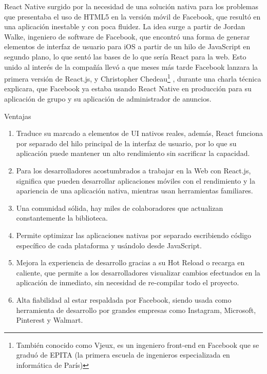 React Native surgido por la necesidad de una solución nativa para los problemas que presentaba el uso de HTML5 en la versión móvil de Facebook, que resultó en una aplicación inestable y con poca fluidez. La idea surge a partir de Jordan Walke, ingeniero de software de Facebook, que encontró una forma de generar elementos de interfaz de usuario para iOS a partir de un hilo de JavaScript en segundo plano, lo que sentó las bases de lo que sería React para la web. Esto unido al interés de la compañía llevó a que meses más tarde Facebook lanzara la primera versión de React.js, y Christopher Chedeau\footnote{También conocido como Vjeux, es un ingeniero front-end en Facebook que se graduó de EPITA (la primera escuela de ingenieros especializada en informática de París)} , durante una charla técnica explicara, que Facebook ya estaba usando React Native en producción para su aplicación de grupo y su aplicación de administrador de anuncios.

Ventajas
\begin{enumerate}

\item	Traduce su marcado a elementos de UI nativos reales, además, React funciona por separado del hilo principal de la interfaz de usuario, por lo que su aplicación puede mantener un alto rendimiento sin sacrificar la capacidad.
\item	Para los desarrolladores acostumbrados a trabajar en la Web con React.js, significa que pueden desarrollar aplicaciones móviles con el rendimiento y la apariencia de una aplicación nativa, mientras usan herramientas familiares.
\item	Una comunidad sólida, hay miles de colaboradores que actualizan constantemente la biblioteca.
\item	Permite optimizar las aplicaciones nativas por separado escribiendo código específico de cada plataforma y usándolo desde JavaScript.
\item	Mejora la experiencia de desarrollo gracias a su Hot Reload o recarga en caliente, que permite a los desarrolladores visualizar cambios efectuados en la aplicación de inmediato, sin necesidad de re-compilar todo el proyecto.
\item	Alta fiabilidad al estar respaldada por Facebook, siendo usada como herramienta de desarrollo por grandes empresas como Instagram, Microsoft, Pinterest y Walmart.
\end{enumerate}

